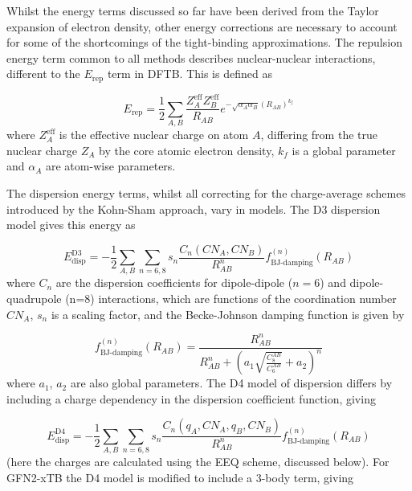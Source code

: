 Whilst the energy terms discussed so far have been derived from the Taylor expansion
of electron density, other energy corrections are necessary to account for some 
of the shortcomings of the tight-binding approximations. The repulsion energy term
common to all methods describes nuclear-nuclear interactions,
different to the $E_{\text{rep}}$ term in DFTB. This is defined as

\begin{equation}
    E_{\text{rep}} = \frac{1}{2}\sum_{A,B} \frac{Z^{\text{eff}}_A Z^{\text{eff}}_B}{R_{AB}} e^{-\sqrt{\alpha_A \alpha_B} \left(R_{AB}\right)^{k_f}}
\end{equation}
%
where $Z^{\text{eff}}_A$ is the effective nuclear charge on atom $A$, differing 
from the true nuclear charge $Z_A$ by the core atomic electron density, $k_f$ is
a global parameter and $\alpha_A$ are atom-wise parameters.

The dispersion energy terms, whilst all correcting for the charge-average schemes
introduced by the Kohn-Sham approach, vary in models. The D3 dispersion model gives
this energy as

\begin{equation}
    E^{\text{D3}}_\text{disp} = -\frac{1}{2}\sum_{A,B}\sum_{n=6,8} s_n \frac{C_n\left(CN_A, CN_B\right)}{R^n_{AB}} f^{\left(n\right)}_{\text{BJ-damping}} \left(R_{AB}\right)
\end{equation}
%
where $C_n$ are the dispersion coefficients for dipole-dipole ($n=6$) and dipole-quadrupole
(n=8) interactions, which are functions of the coordination number $CN_A$, $s_n$
is a scaling factor, and the Becke-Johnson damping function \cite{Johnson2005, Becke2005} 
is given by

\begin{equation}
    f^{\left(n\right)}_{\text{BJ-damping}}\left(R_{AB}\right) = \frac{R^n_{AB}}{R^n_{AB} + \left(a_1 \sqrt{\frac{C_8^{AB}}{C_6^{AB}}} + a_2 \right)^n} 
\end{equation}
%
where $a_1$, $a_2$ are also global parameters. The D4 model of dispersion differs
by including a charge dependency in the dispersion coefficient function, giving

\begin{equation}
    E^{\text{D4}}_\text{disp} = -\frac{1}{2}\sum_{A,B}\sum_{n=6,8} s_n \frac{C_n\left(q_A, CN_A, q_B, CN_B\right)}{R^n_{AB}} f^{\left(n\right)}_{\text{BJ-damping}} \left(R_{AB}\right)
\end{equation}
%
(here the charges are calculated using the EEQ scheme, discussed below). For GFN2-xTB
the D4 model is modified to include a 3-body term, giving

